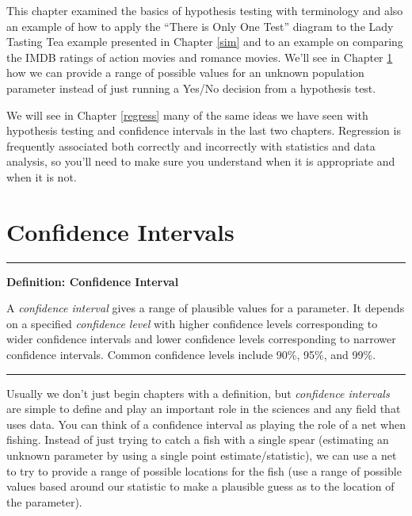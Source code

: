 \documentclass[]{tufte-book}
\let\oldrule=\rule
\renewcommand{\rule}[1]{\oldrule{\linewidth}}
\begin{document}
This chapter examined the basics of hypothesis testing with terminology
and also an example of how to apply the ``There is Only One Test''
diagram to the Lady Tasting Tea example presented in Chapter \ref{sim}
and to an example on comparing the IMDB ratings of action movies and
romance movies. We'll see in Chapter \ref{ci} how we can provide a range
of possible values for an unknown population parameter instead of just
running a Yes/No decision from a hypothesis test.

We will see in Chapter \ref{regress} many of the same ideas we have seen
with hypothesis testing and confidence intervals in the last two
chapters. Regression is frequently associated both correctly and
incorrectly with statistics and data analysis, so you'll need to make
sure you understand when it is appropriate and when it is not.

\chapter{Confidence Intervals}\label{ci}

\begin{center}\rule{0.5\linewidth}{\linethickness}\end{center}

\textbf{Definition: Confidence Interval}

A \emph{confidence interval} gives a range of plausible values for a
parameter. It depends on a specified \emph{confidence level} with higher
confidence levels corresponding to wider confidence intervals and lower
confidence levels corresponding to narrower confidence intervals. Common
confidence levels include 90\%, 95\%, and 99\%.

\begin{center}\rule{0.5\linewidth}{\linethickness}\end{center}

Usually we don't just begin chapters with a definition, but
\emph{confidence intervals} are simple to define and play an important
role in the sciences and any field that uses data. You can think of a
confidence interval as playing the role of a net when fishing. Instead
of just trying to catch a fish with a single spear (estimating an
unknown parameter by using a single point estimate/statistic), we can
use a net to try to provide a range of possible locations for the fish
(use a range of possible values based around our statistic to make a
plausible guess as to the location of the parameter).
\end{document}
